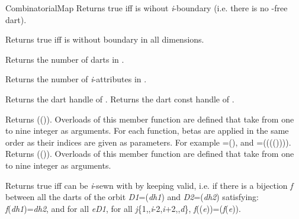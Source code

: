 \begin{ccRefConcept}{CombinatorialMap}
         {Returns true iff  is wihout \emph{i}-boundary
          (i.e. there is no -free dart).
          }

         {Returns true iff  is without boundary in all dimensions.}

    {Returns the number of darts in .}

   {Returns the number of \emph{i}-attributes in . 
     }

    {Returns the dart handle of .
}
\ccGlue
{}
    {Returns the dart const handle of .
}

{Returns \betaj{}(\betai{}()). 
 Overloads of this member function are defined that take from one to nine integer as arguments.
 For each function, betas are applied in the same order as their indices are given as parameters. 
 For example =\betaun{}(),
 and =\betazero{}(\betatrois{}(\betadeux{}(\betaun{}()))).
}
\ccGlue
{}
{Returns \betaj{}(\betai{}()).
  Overloads of this member function are defined that take from one to nine integer as arguments.
}

         {Returns true iff  can be \emph{i}-sewn with  by 
           keeping  valid, i.e. if there is
           a bijection \emph{f} between all the darts of the orbit
           \emph{D1}=\orbit{\betaun{},\myldots{},\betaimdeux{},\betaipdeux{},\myldots{},\betad{}}(\emph{dh1}) and
           \emph{D2}=\orbit{\betaun{},\myldots{},\betaimdeux{},\betaipdeux{},\myldots{},\betad{}}(\emph{dh2})
           satisfying: \emph{f}(\emph{dh1})=\emph{dh2}, and for all \emph{e}\myin{}\emph{D1}, for all \emph{j}\myin{}\{1,\myldots{},\emph{i}-2,\emph{i}+2,\myldots{},\emph{d}\},
           \emph{f}(\betaj{}(\emph{e}))=\betajinv{}(\emph{f}(\emph{e})).           
           }	


\end{ccRefConcept}
